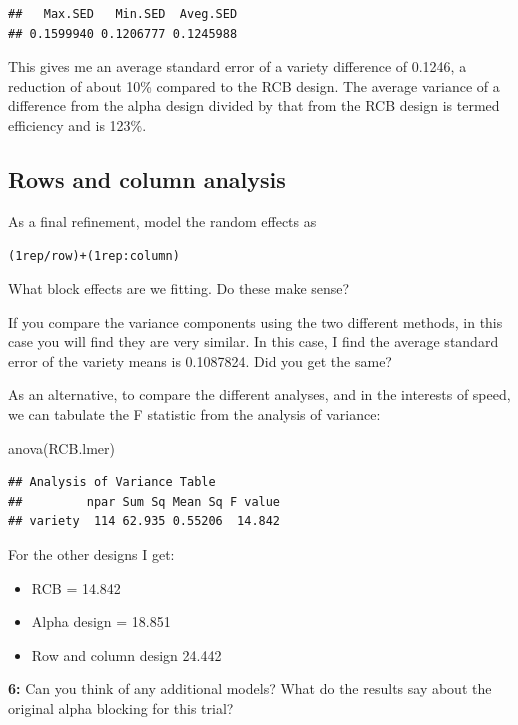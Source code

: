 \documentclass[
]{book}
\makeatletter
\newenvironment{Shaded}{\begin{snugshade}}{\end{snugshade}}
\newcommand{\FunctionTok}[1]{\textcolor[rgb]{0.00,0.00,0.00}{#1}}
\newcommand{\NormalTok}[1]{#1}
\providecommand{\tightlist}{%
  \setlength{\itemsep}{0pt}\setlength{\parskip}{0pt}}
\newenvironment{kframe}{%
\medskip{}
\setlength{\fboxsep}{.8em}
 \def\at@end@of@kframe{}%
 \ifinner\ifhmode%
  \def\at@end@of@kframe{\end{minipage}}%
  \begin{minipage}{\columnwidth}%
 \fi\fi%
 \def\FrameCommand##1{\hskip\@totalleftmargin \hskip-\fboxsep
 \colorbox{shadecolor}{##1}\hskip-\fboxsep
     \hskip-\linewidth \hskip-\@totalleftmargin \hskip\columnwidth}%
 \MakeFramed {\advance\hsize-\width
   \@totalleftmargin\z@ \linewidth\hsize
   \@setminipage}}%
 {\par\unskip\endMakeFramed%
 \at@end@of@kframe}
\newenvironment{rmdblock}[1]
  {
  \begin{itemize}
  \renewcommand{\labelitemi}{
    \raisebox{-.7\height}[0pt][0pt]{
      {\setkeys{Gin}{width=3em,keepaspectratio}\texttt{[image: images/\#1]}}
    }
  }
  \setlength{\fboxsep}{1em}
  \begin{kframe}
  \item
  }
  {
  \end{kframe}
  \end{itemize}
  }
\newenvironment{rmdquiz}
  {\begin{rmdblock}{quiz}}
  {\end{rmdblock}}
\makeatother
\begin{document}
\begin{verbatim}
##   Max.SED   Min.SED  Aveg.SED 
## 0.1599940 0.1206777 0.1245988
\end{verbatim}

This gives me an average standard error of a variety difference of 0.1246, a reduction of about 10\% compared to the RCB design. The average variance of a difference from the alpha design divided by that from the RCB design is termed efficiency and is 123\%.

\hypertarget{rows-and-column-analysis}{%
\subsection{Rows and column analysis}\label{rows-and-column-analysis}}

As a final refinement, model the random effects as

\texttt{(1\textbar{}rep/row)+(1\textbar{}rep:column)}

What block effects are we fitting. Do these make sense?

If you compare the variance components using the two different methods, in this case you will find they are very similar. In this case, I find the average standard error of the variety means is 0.1087824. Did you get the same?

As an alternative, to compare the different analyses, and in the interests of speed, we can tabulate the F statistic from the analysis of variance:

\begin{Shaded}
\begin{Highlighting}[]
\FunctionTok{anova}\NormalTok{(RCB.lmer)}
\end{Highlighting}
\end{Shaded}

\begin{verbatim}
## Analysis of Variance Table
##         npar Sum Sq Mean Sq F value
## variety  114 62.935 0.55206  14.842
\end{verbatim}

For the other designs I get:

\begin{itemize}
\tightlist
\item
  RCB = 14.842
\item
  Alpha design = 18.851
\item
  Row and column design 24.442
\end{itemize}

\begin{rmdquiz}
\textbf{6:}
Can you think of any additional models? What do the results say about the original alpha blocking for this trial?
\end{rmdquiz}
\end{document}
